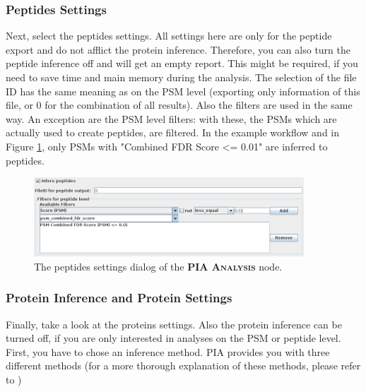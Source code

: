 \documentclass[a4paper,11pt,twoside]{article}
\newcommand{\knimenode}[1]{{\scshape\bfseries #1}}
\begin{document}
\subsubsection{Peptides Settings}

Next, select the peptides settings. All settings here are only for the peptide
export and do not afflict the protein inference. Therefore, you can also turn
the peptide inference off and will get an empty report. This might be required,
if you need to save time and main memory during the analysis. The selection of
the file ID has the same meaning as on the PSM level (exporting only
information of this file, or 0 for the combination of all results). Also the
filters are used in the same way. An exception are the PSM level filters: with
these, the PSMs which are actually used to create peptides, are filtered. In
the example workflow and in Figure \ref{pia_settings_peptides}, only PSMs with
"Combined FDR Score <= 0.01" are inferred to peptides.

\begin{figure}[ht!]
	\centering
	\includegraphics[width=0.9\textwidth]{graphics/pia_settings_peptides}
	\caption{The peptides settings dialog of the \knimenode{PIA Analysis} node.}
	\label{pia_settings_peptides}
\end{figure}


\subsubsection{Protein Inference and Protein Settings}

Finally, take a look at the proteins settings. Also the protein inference can
be turned off, if you are only interested in analyses on the PSM or peptide
level. First, you have to chose an inference method. PIA provides you with
three different methods (for a more thorough explanation of these methods,
please refer to \cite{uszkoreit2015})
\end{document}
